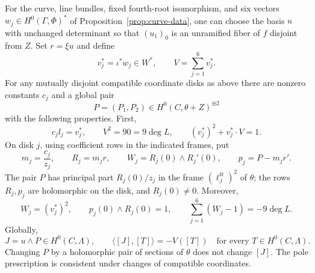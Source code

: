\begin{proposition}\label{prop:residue-data}
For the curve, line bundles, fixed fourth-root isomorphism, and six
vectors $w_j\in H^0(\Gamma,\Phi)^*$ of
Proposition~\ref{prop:curve-data}, one can choose the basis $u$ with
unchanged determinant so that $(u_1)_0$ is an unramified fiber of $f$
disjoint from $Z$.  Set $r=\xi u$ and define
\[
 v_j^*=\iota^*w_j\in W^*,\qquad V=\sum_{j=1}^6v_j^*.
\]
For any mutually disjoint compatible coordinate disks as above there
are nonzero constants $c_j$ and a global pair
\[
 P=(P_1,P_2)\in H^0(C,\theta+Z)^{\oplus2}
\]
with the following properties.  First,
\begin{equation}\label{trace:vector-identities}
 c_jl_j=v_j^*,\qquad
 V^2=90=9\deg L,\qquad (v_j^*)^2+v_j^*\cdot V=1.
\end{equation}
On disk $j$, using coefficient rows in the indicated frames, put
\begin{equation}\label{trace:local-data}
 m_j=\frac{c_j}{z_j},\qquad
 R_j=m_jr,\qquad
 W_j=R_j(0)\wedge R_j'(0),\qquad
 p_j=P-m_jr'.
\end{equation}
The pair $P$ has principal part $R_j(0)/z_j$ in the frame
$(\ell_j^{\mathrm{fr}})^2$ of $\theta$; the rows $R_j,p_j$ are
holomorphic on the disk, and $R_j(0)\ne0$.  Moreover,
\begin{equation}\label{trace:residue-identities}
 W_j=(v_j^*)^2,\qquad
 p_j(0)\wedge R_j(0)=1,\qquad
 \sum_{j=1}^6(W_j-1)=-9\deg L.
\end{equation}
Globally,
\begin{equation}\label{trace:J}
 J=u\wedge P\in H^0(C,\Lambda),\qquad
 \langle[J],[T]\rangle=-V([T])
       \quad\text{for every }T\in H^0(C,\Lambda).
\end{equation}
Changing $P$ by a holomorphic pair of sections of $\theta$ does not
change $[J]$.  The pole prescription is consistent under changes of
compatible coordinates.
\end{proposition}

